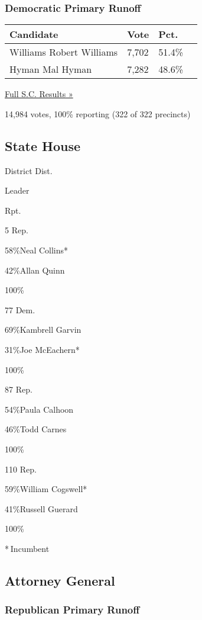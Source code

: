 \hypertarget{democratic-primary-runoff-2}{%
\subsubsection{Democratic Primary
Runoff}\label{democratic-primary-runoff-2}}

\begin{longtable}[]{@{}llll@{}}
\toprule
Candidate & Vote & Pct. &\tabularnewline
\midrule
\endhead
 Williams Robert Williams & 7,702 & 51.4\% &\tabularnewline
 Hyman Mal Hyman & 7,282 & 48.6\% &\tabularnewline
\bottomrule
\end{longtable}

\href{https://www.nytimes3xbfgragh.onion/elections/results/south-carolina}{Full
S.C. Results »}

14,984 votes, 100\% reporting (322 of 322 precincts)

\hypertarget{state-house}{%
\subsection{State House}\label{state-house}}

District Dist.

Leader

Rpt.

5 Rep.

 58\%Neal Collins*

 42\%Allan Quinn

100\%

77 Dem.

 69\%Kambrell Garvin

 31\%Joe McEachern*

100\%

87 Rep.

 54\%Paula Calhoon

 46\%Todd Carnes

100\%

110 Rep.

 59\%William Cogswell*

 41\%Russell Guerard

100\%

* Incumbent~

\hypertarget{attorney-general}{%
\subsection{Attorney General}\label{attorney-general}}

\hypertarget{republican-primary-runoff-2}{%
\subsubsection{Republican Primary
Runoff}\label{republican-primary-runoff-2}}

